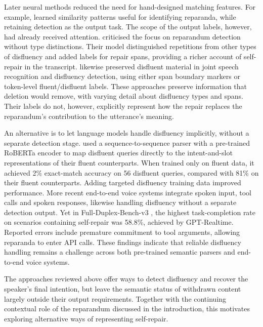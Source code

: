 Later neural methods reduced the need for hand-designed matching features.
For example, \citet{zayatsRobustCrossdomainDisfluency2018} learned similarity
patterns useful for identifying reparanda, while retaining detection as the
output task. The scope of the output labels, however, had already received
attention. \citet{zayatsMultidomainDisfluencyRepair2014} criticised the focus
on reparandum detection without type distinctions. Their model distinguished
repetitions from other types of disfluency and added labels for repair spans,
providing a richer account of self-repair in the transcript.
\citet{futamiStreamingJointSpeech2023} likewise preserved disfluent material
in joint speech recognition and disfluency detection, using either span
boundary markers or token-level fluent/disfluent labels. These approaches
preserve information that deletion would remove, with varying detail about
disfluency types and spans. Their labels do not, however, explicitly
represent how the repair replaces the reparandum's contribution to the
utterance's meaning.

An alternative is to let language models handle disfluency implicitly,
without a separate detection stage.
\citet{senSemanticParsingDisfluent2021} used a sequence-to-sequence parser
with a pre-trained RoBERTa encoder to map disfluent queries directly to
the intent-and-slot representations of their fluent counterparts. When
trained only on fluent data, it achieved 2\% exact-match accuracy on 56
disfluent queries, compared with 81\% on their fluent counterparts.
Adding targeted disfluency training data improved performance. More recent
end-to-end voice systems integrate spoken input, tool calls and spoken
responses, likewise handling disfluency without a separate detection
output. Yet in Full-Duplex-Bench-v3 \citep{linFullDuplexBenchv3BenchmarkingTool2026}, the highest task-completion rate on
scenarios containing self-repair was 58.8\%, achieved by GPT-Realtime. Reported errors include
premature commitment to tool arguments, allowing reparanda to enter
API calls. These findings indicate that reliable disfluency handling
remains a challenge across both pre-trained semantic parsers and
end-to-end voice systems.

The approaches reviewed above offer ways to detect disfluency and recover
the speaker's final intention, but leave the semantic status of withdrawn
content largely outside their output requirements. Together with the
continuing contextual role of the reparandum discussed in the introduction,
this motivates exploring alternative ways of representing self-repair.

